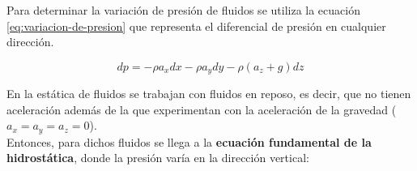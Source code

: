 %
%
%
%
%
%
%

Para determinar la variación de presión de fluidos se utiliza la ecuación \ref{eq:variacion-de-presion} que representa el diferencial de presión en cualquier dirección. 

\begin{equation}
	dp = -\rho a_x dx -\rho a_y dy -\rho (a_z + g) dz
	\label{eq:variacion-de-presion}
\end{equation}

En la estática de fluidos se trabajan con fluidos en reposo, es decir, que no tienen aceleración además de la que experimentan con la aceleración de la gravedad ($a_x = a_y = a_z = 0$).\\


Entonces, para dichos fluidos se llega a la \textbf{ecuación fundamental de la hidrostática}, donde la presión varía en la dirección vertical:

